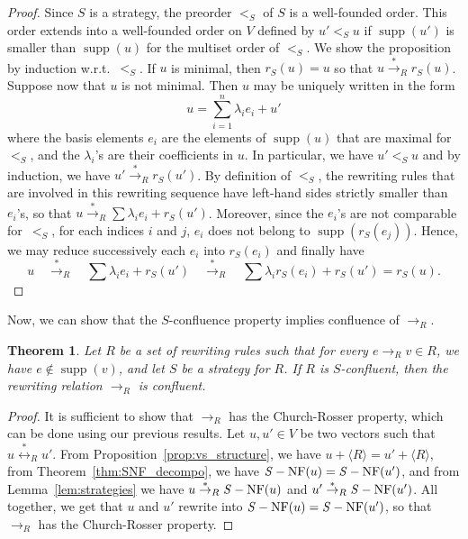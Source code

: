 \documentclass[11pt]{article}
\newtheorem{theorem}{Theorem}[section]
\theoremstyle{definition}
\newcommand\wrt{w.r.t.}
\newcommand\ordS{<_S}
\DeclareMathOperator{\supp}{supp}
\newcommand\Span[1]{\langle #1\rangle}
\newcommand\rewR{\to_R}
\newcommand\transR{\overset{*}{\to}_R}
\newcommand\equivR{\overset{*}{\leftrightarrow}_R}
\DeclareMathOperator{\SNF}{{\it S}-NF}
\begin{document}
\begin{proof}
  Since $S$ is a strategy, the preorder $\ordS$ of $S$ is a
  well-founded order. This order extends into a well-founded order on $V$
  defined by $u'\ordS u$ if $\supp(u')$ is smaller than $\supp(u)$ for
  the multiset order of $\ordS$. We show the proposition by induction
  \wrt\ $\ordS$. If $u$ is minimal, then $r_S(u)=u$ so that
  $u\transR r_S(u)$. Suppose now that $u$ is not minimal. Then $u$ may be
  uniquely written in the form 
  \begin{equation*}\label{equ:decompo_max}
    u=\sum_{i=1}^n\lambda_ie_i+u'
  \end{equation*}
  where the basis elements $e_i$ are the elements of $\supp(u)$ that are
  maximal for~$\ordS$, and the $\lambda_i$'s are their coefficients in
  $u$. In particular, we have $u'<_S u$ and by induction, we have
  $u'\transR r_S(u')$. By definition of $\ordS$, the rewriting rules that
  are involved in this rewriting sequence have left-hand sides strictly
  smaller than $e_i$'s, so that $u\transR\sum\lambda_ie_i+r_S(u')$.
  Moreover, since the $e_i$'s are not comparable for~$\ordS$, for each
  indices $i$ and $j$, $e_i$ does not belong to $\supp(r_S(e_j))$. Hence,
  we may reduce successively each $e_i$ into $r_S(e_i)$ and finally have
  \[
  u \quad\transR\quad
  \sum \lambda_ie_i+r_S(u')\quad\transR\quad
  \sum\lambda_ir_S(e_i) + r_S(u')
  =r_S(u).\]
\end{proof}
\smallskip

Now, we can show that the $S$-confluence property implies confluence of
$\rewR$.
\medskip

\begin{theorem}\label{thm-S-conf}
  Let $R$ be a set of rewriting rules such that for every
  $e\rewR v\in R$, we have $e\notin\supp(v)$, and let $S$ be a strategy
  for $R$. If $R$ is $S$-confluent, then the rewriting relation $\rewR$
  is confluent.
\end{theorem}

\begin{proof}
  It is sufficient to show that $\rewR$ has the Church-Rosser property,
  which can be done using our previous results. Let $u,u'\in V$ be two
  vectors such that $u\equivR u'$. From
  Proposition~\ref{prop:vs_structure}, we have $u+\Span{R}=u'+\Span{R}$,
  from Theorem~\ref{thm:SNF_decompo}, we have $\SNF(u)=\SNF(u')$,
  and from Lemma~\ref{lem:strategies} we have $u\transR\SNF(u)$ and
  $u'\transR\SNF(u')$. All together, we get that $u$ and $u'$ rewrite 
  into $\SNF(u)=\SNF(u')$, so that~$\rewR$ has the Church-Rosser
  property.
\end{proof}
\smallskip
\end{document}
